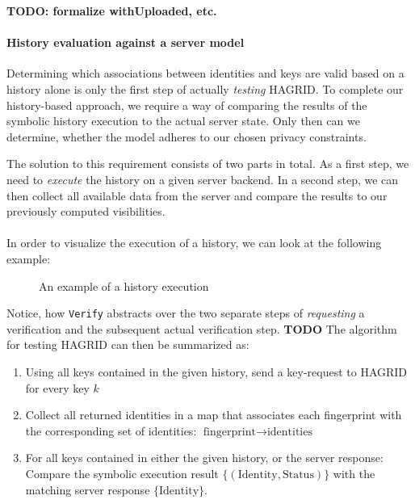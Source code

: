 \textbf{TODO: formalize withUploaded, etc. }

\paragraph{History evaluation against a server model}
Determining which associations between identities and keys are valid based on a history alone is only the first step of actually \emph{testing} HAGRID. To complete our history-based approach, we require a way of comparing the results of the symbolic history execution to the actual server state. Only then can we determine, whether the model adheres to our chosen privacy constraints.



The solution to this requirement consists of two parts in total. As a first step, we need to \emph{execute} the history on a given server backend. In a second step, we can then collect all available data from the server and compare the results to our previously computed visibilities. 
\\ \\
In order to visualize the execution of a history, we can look at the following example: 
\begin{figure}[H]
    \label{fig:history}
    \centering
    \caption{An example of a history execution}
\end{figure}


Notice, how \texttt{Verify} abstracts over the two separate steps of \emph{requesting} a verification and the subsequent actual verification step.
\textbf{TODO}
The algorithm for testing HAGRID can then be summarized as: 
\begin{enumerate}
    \item Using all keys contained in the given history, send a key-request to HAGRID for every key $k$
    \item Collect all returned identities in a map that associates each fingerprint with the corresponding set of identities: $ \text{fingerprint} \rightarrow \text{identities}$
    \item\label{sec:comp_hagrid} For all keys contained in either the given history, or the server response: Compare the symbolic execution result $\{(\text{Identity},\text{Status})\}$ with the matching server response $\{\text{Identity}\}$.
\end{enumerate}


